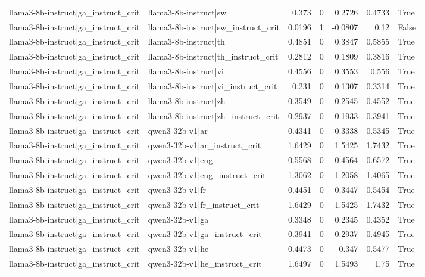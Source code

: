 \begin{table}
\begin{tabular}{l l r r r r l}
llama3-8b-instruct|ga_instruct_crit & llama3-8b-instruct|sw & 0.373 & 0 & 0.2726 & 0.4733 & True \\
llama3-8b-instruct|ga_instruct_crit & llama3-8b-instruct|sw_instruct_crit & 0.0196 & 1 & -0.0807 & 0.12 & False \\
llama3-8b-instruct|ga_instruct_crit & llama3-8b-instruct|th & 0.4851 & 0 & 0.3847 & 0.5855 & True \\
llama3-8b-instruct|ga_instruct_crit & llama3-8b-instruct|th_instruct_crit & 0.2812 & 0 & 0.1809 & 0.3816 & True \\
llama3-8b-instruct|ga_instruct_crit & llama3-8b-instruct|vi & 0.4556 & 0 & 0.3553 & 0.556 & True \\
llama3-8b-instruct|ga_instruct_crit & llama3-8b-instruct|vi_instruct_crit & 0.231 & 0 & 0.1307 & 0.3314 & True \\
llama3-8b-instruct|ga_instruct_crit & llama3-8b-instruct|zh & 0.3549 & 0 & 0.2545 & 0.4552 & True \\
llama3-8b-instruct|ga_instruct_crit & llama3-8b-instruct|zh_instruct_crit & 0.2937 & 0 & 0.1933 & 0.3941 & True \\
llama3-8b-instruct|ga_instruct_crit & qwen3-32b-v1|ar & 0.4341 & 0 & 0.3338 & 0.5345 & True \\
llama3-8b-instruct|ga_instruct_crit & qwen3-32b-v1|ar_instruct_crit & 1.6429 & 0 & 1.5425 & 1.7432 & True \\
llama3-8b-instruct|ga_instruct_crit & qwen3-32b-v1|eng & 0.5568 & 0 & 0.4564 & 0.6572 & True \\
llama3-8b-instruct|ga_instruct_crit & qwen3-32b-v1|eng_instruct_crit & 1.3062 & 0 & 1.2058 & 1.4065 & True \\
llama3-8b-instruct|ga_instruct_crit & qwen3-32b-v1|fr & 0.4451 & 0 & 0.3447 & 0.5454 & True \\
llama3-8b-instruct|ga_instruct_crit & qwen3-32b-v1|fr_instruct_crit & 1.6429 & 0 & 1.5425 & 1.7432 & True \\
llama3-8b-instruct|ga_instruct_crit & qwen3-32b-v1|ga & 0.3348 & 0 & 0.2345 & 0.4352 & True \\
llama3-8b-instruct|ga_instruct_crit & qwen3-32b-v1|ga_instruct_crit & 0.3941 & 0 & 0.2937 & 0.4945 & True \\
llama3-8b-instruct|ga_instruct_crit & qwen3-32b-v1|he & 0.4473 & 0 & 0.347 & 0.5477 & True \\
llama3-8b-instruct|ga_instruct_crit & qwen3-32b-v1|he_instruct_crit & 1.6497 & 0 & 1.5493 & 1.75 & True \\

\end{tabular}
\end{table}
